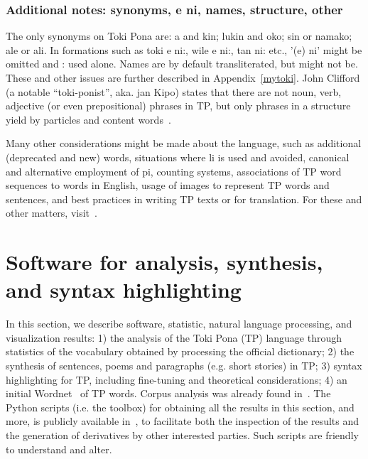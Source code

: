 
\subsubsection{Additional notes: synonyms, e ni, names, structure, other}\label{sec:add}
The only synonyms on Toki Pona are:
a and kin; lukin and oko; sin or namako;
ale or ali.
In formations such as
toki e ni:, wile e ni:, tan ni: etc.,
'(e) ni' might be omitted and : used alone.
Names are by default transliterated,
but might not be.
These and other issues are further described in Appendix~\ref{mytoki}.
John Clifford (a notable ``toki-ponist'', aka. jan Kipo)
states that there are not noun, verb, adjective (or even prepositional)
phrases in TP, but only phrases in a structure
yield by particles and content words~\cite{janKipo}.

Many other considerations might be made about the language,
such as additional (deprecated and new) words,
situations where li is used and avoided,
canonical and alternative employment of pi,
counting systems,
associations of TP word sequences to words in English,
usage of images to represent TP words and sentences,
and best practices in writing TP texts or for translation.
For these and other matters, visit~\cite{tpLang,kama,tp4,gdoc}.

\section{Software for analysis, synthesis, and syntax highlighting}\label{hacks}
In this section,
we describe software, statistic, natural language processing,
and visualization results:
1)
the analysis of the Toki Pona (TP) language through statistics
of the vocabulary obtained by processing the official dictionary;
2)
the synthesis of sentences, poems and paragraphs (e.g. short stories)
in TP;
3)
syntax highlighting for TP,
including fine-tuning and theoretical
considerations;
4)
an initial Wordnet~\cite{wordnet} of
TP words.
Corpus analysis was already found in~\cite{corpus}.
The Python scripts (i.e. the toolbox)
for obtaining all the results in this section,
and more, is publicly available in~\cite{tokipona},
to facilitate both the inspection of the results and the
generation of derivatives by other interested parties.
Such scripts are friendly to understand and alter.


